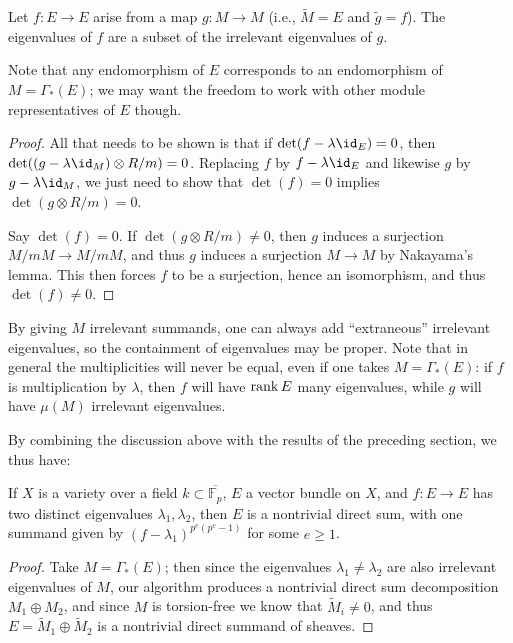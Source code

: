 \documentclass[12pt]{article}
\let\l\lambda
\let\wtilde\widetilde
\numberwithin{equation}{section}
\theoremstyle{theorem}
\numberwithin{thm}{section}
\theoremstyle{definition}
\begin{document}
\begin{lem}
Let $f:E\to E$ arise from a map $g:M\to M$ (i.e., $\wtilde M = E$ and $\wtilde g = f$).
The eigenvalues of $f$ are a subset of the irrelevant eigenvalues of $g$.
\end{lem}

Note that any endomorphism of $E$ corresponds to an endomorphism of $M=\Gamma_*(E)$; we may want the freedom to work with other module representatives of $E$ though.

\begin{proof}
  All that needs to be shown is that if $\det(f-\l \id_E) =0$, then $\det((g-\l \id_M)\otimes R/m)=0$.
Replacing $f$ by $f-\l \id_E$ and likewise $g$ by $g-\l\id_M$, we just need to show that $\det(f)=0$ implies $\det(g\otimes R/m)=0$.

Say $\det(f)=0$.
If $\det(g\otimes R/m)\neq 0$, then $g$ induces a surjection $M/mM\to M/mM$, and thus $g$ induces a surjection $M\to M$ by Nakayama's lemma. This then forces $f$ to be a surjection, hence an isomorphism, and thus $\det(f)\neq 0$.
\end{proof}

\begin{exa}
By giving $M$ irrelevant summands, one can always add ``extraneous'' irrelevant eigenvalues, so the containment of eigenvalues may be proper.
Note that in general the multiplicities will never be equal, even if one takes $M=\Gamma_*(E)$: if $f$ is multiplication by $\l$, then $f$ will have $\operatorname{rank} E$ many eigenvalues, while $g$ will have $\mu(M)$ irrelevant eigenvalues.
\end{exa}

By combining the discussion above with the results of the preceding section, we thus have:

\begin{prop}
If $X$ is a variety over a field $k\subset \overline{\mathbb F_{p}}$,
$E$ a vector bundle on $X$, and $f:E\to E$ has two distinct eigenvalues $\l_1,\l_2$, then $E$ is a nontrivial direct sum, with one summand given by $(f-\l_1)^{p^e(p^e-1)}$ for some $e\geq 1$.
\end{prop}

\begin{proof}
Take $M= \Gamma_*(E)$; then since the eigenvalues $\l_1\neq \l_2$ are also irrelevant eigenvalues of $M$, our algorithm produces a nontrivial direct sum decomposition $M_1\oplus M_2$, and since $M$ is torsion-free we know that $\widetilde M_i\neq 0$, and thus $E=\widetilde M_1\oplus \widetilde M_2$ is a nontrivial direct summand of sheaves.
\end{proof}
\end{document}
